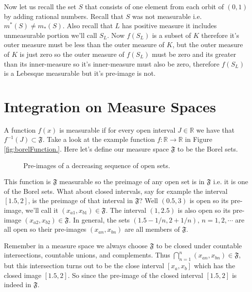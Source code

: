 \documentclass[oneside]{book}
\begin{document}
\begin{enumerate}
Now let us recall the set $S$ that consists of one element from each orbit of $(0,1)$ by adding rational numbers. Recall that $S$ was not measurable i.e. $m^*(S) \neq m_*(S)$. Also recall that $L$ has positive measure it includes unmeasurable portion we'll call $S_L$. Now $f(S_L)$ is a subset of $K$ therefore it's outer measure must be less than the outer measure of $K$, but the outer measure of $K$ is just zero so the outer measure of $f(S_L)$ must be zero and its greater than its inner-measure so it's inner-measure must also be zero, therefore $f(S_L)$ is a Lebesque measurable but it's pre-image is not. 

\end{enumerate}
\chapter{Integration on Measure Spaces}

A function $f(x)$ is measurable if for every open interval $J \in \mathbb{R}$ we have that $f^{-1}(J) \subset \mathfrak{F}$. Take a look at the example function $f:\mathbb{R} \to \mathbb{R}$ in Figure \ref{fig:borelFunction.}. Here let's define our measure space $\mathfrak{F}$ to be the Borel sets. 

\begin{figure}[h]
    \centering
    \caption{Pre-images of a decreasing sequence of open sets.}
    \label{fig:borelFunction}
\end{figure}

This function is $\mathfrak{F}$ measurable so the preimage of any open set is in $\mathfrak{F}$ i.e. it is one of the Borel sets. What about closed intervals, say for example the interval $[1.5,2]$, is the preimage of that interval in $\mathfrak{F}$? Well $(0.5,3)$ is open so its pre-image, we'll call it $(x_{a1},x_{b1}) \in \mathfrak{F}$. The interval $(1,2.5)$ is also open so its pre-image $(x_{a2},x_{b2}) \in \mathfrak{F}$. In general, the sets $(1.5-1/n,2+1/n),\, n=1,2,\cdots$ are all open so their pre-images $(x_{an},x_{bn})$ are all members of $\mathfrak{F}$.

Remember  in a measure space we always choose $\mathfrak{F}$ to be closed under countable intersections, countable unions, and complements. Thus $\bigcap_{n =1}^n(x_{an},x_{bn}) \in \mathfrak{F}$, but this intersection turns out to be the close interval $[x_a,x_b]$ which has the closed image $[1.5,2]$. So since the pre-image of the closed interval $[1.5,2]$ is indeed in $\mathfrak{F}$. 
\end{document}
